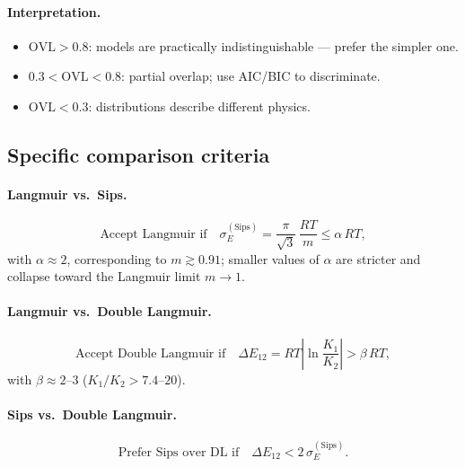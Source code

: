 \documentclass[journal=aamick,manuscript=article]{achemso}
\begin{document}
\paragraph{Interpretation.}
\begin{itemize}
	\item $\mathrm{OVL} > 0.8$: models are practically
	indistinguishable --- prefer the simpler one.
	\item $0.3 < \mathrm{OVL} < 0.8$: partial overlap; use AIC/BIC
	to discriminate.
	\item $\mathrm{OVL} < 0.3$: distributions describe different
	physics.
\end{itemize}

\subsection{Specific comparison criteria}
\label{sec:si_comparison_criteria}

\paragraph{Langmuir vs.\ Sips.}
\begin{equation}
	\boxed{
		\text{Accept Langmuir if}\quad
		\sigma_E^{\mathrm{(Sips)}}
		= \frac{\pi}{\sqrt{3}}\,\frac{RT}{m} \leq \alpha\,RT,
	}
	\label{eq:si_criterion_LvsS}
\end{equation}
with $\alpha \approx 2$, corresponding to $m \gtrsim 0.91$; smaller
values of $\alpha$ are stricter and collapse toward the Langmuir limit
$m \to 1$.

\paragraph{Langmuir vs.\ Double Langmuir.}
\begin{equation}
	\boxed{
		\text{Accept Double Langmuir if}\quad
		\Delta E_{12} = RT\left|\ln\frac{K_1}{K_2}\right| > \beta\,RT,
	}
	\label{eq:si_criterion_LvsDL}
\end{equation}
with $\beta \approx 2$--$3$ ($K_1/K_2 > 7.4$--$20$).

\paragraph{Sips vs.\ Double Langmuir.}
\begin{equation}
	\boxed{
		\text{Prefer Sips over DL if}\quad
		\Delta E_{12} < 2\,\sigma_E^{\mathrm{(Sips)}}.
	}
	\label{eq:si_criterion_SvsDL}
\end{equation}
\end{document}
